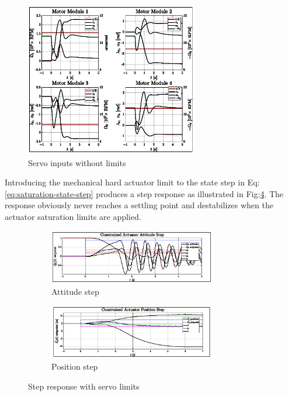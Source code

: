 \newpage
\begin{figure}[hbtp]
\vspace{-6pt}
\centering
\includegraphics[width=0.67\textwidth]{graphs/unsaturated-servos}
\vspace{-10pt}
\caption{Servo inputs without limits}
\label{fig:unsaturated-servos}
\vspace{-10pt}
\end{figure}
\par
Introducing the mechanical hard actuator limit to the state step in Eq:\ref{eq:saturation-state-step} produces a step response as illustrated in Fig:\ref{fig:saturated-step}. The response obviously never reaches a settling point and destabilizes when the actuator saturation limits are applied.
\begin{figure}[hbtp]
\vspace{-8pt}
\centering
\begin{subfigure}{\textwidth}
\centering
\includegraphics[width=0.8\textwidth]{graphs/saturated-attitude-step}
\vspace{-6pt}
\caption{Attitude step}
\label{fig:saturated-attitude}
\end{subfigure}
\vspace{-8pt}
\begin{subfigure}{\textwidth}
\centering
\includegraphics[width=0.8\textwidth]{graphs/saturated-position-step}
\vspace{-6pt}
\caption{Position step}
\label{fig:saturated-position}
\end{subfigure}
\caption{Step response with servo limits}
\label{fig:saturated-step}
\vspace{-24pt}
\end{figure}
